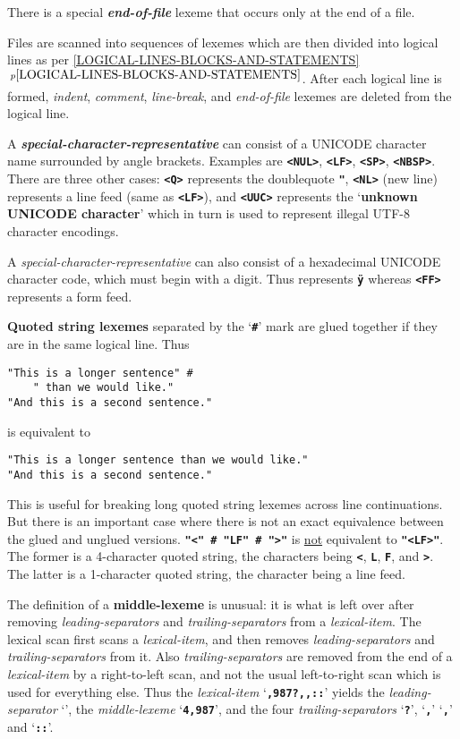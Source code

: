 \documentclass[12pt]{article}
\newcommand{\TT}[1]{{\tt \bfseries #1}}
\newcommand{\key}[1]{{\rm \bfseries #1}}
\newcommand{\emkey}[1]{{\em \bfseries #1}}
\newcommand{\tttkey}[1]{{\tt \bfseries <#1>}}
\newcommand{\itemref}[1]{\ref{#1}$\,^{p\pageref{#1}}$}
\newenvironment{indpar}[1][0.3in]%
	{\begin{list}{}%
		     {\setlength{\itemsep}{0in}%
		      \setlength{\topsep}{0in}%
		      \setlength{\parsep}{1ex}%
		      \setlength{\labelwidth}{#1}%
		      \setlength{\leftmargin}{#1}%
		      \addtolength{\leftmargin}{\labelsep}}%
	 \item}%
	{\end{list}}
\begin{document}
There is a special \emkey{end-of-file}\label{END-OF-FILE}
lexeme that occurs only at the end of a file.

Files are scanned into sequences of lexemes which are then divided
into logical lines as per \itemref{LOGICAL-LINES-BLOCKS-AND-STATEMENTS}.
After each logical line is formed,
{\em indent}, {\em comment},
{\em line-break}, and {\em end-of-file} lexemes are deleted
from the logical line.

A \emkey{special-character-representative} can consist of
a UNICODE character name surrounded by angle brackets.  Examples are
\TT{<NUL>}, \TT{<LF>}, \TT{<SP>}, \TT{<NBSP>}.  There are three other cases:
\tttkey{Q} represents the doublequote \TT{"}, \tttkey{NL} (new line)
represents a line feed (same as \TT{<LF>}), and \tttkey{UUC} represents
the `\key{unknown UNICODE character}' which in turn is used to represent
illegal UTF-8 character encodings.

A {\em special-character-representative} can also consist of
a hexadecimal UNICODE character code, which must begin with a digit.
Thus \TT{<0FF>} represents \TT{\"y} whereas \TT{<FF>} represents
a form feed.

\key{Quoted string lexemes}
\label{QUOTED-STRING-CONCATENATION}
separated by the `\TT{\#}' mark
are glued together if they are in the
same logical line.  Thus
\begin{indpar}\begin{verbatim}
"This is a longer sentence" #
    " than we would like."
"And this is a second sentence."
\end{verbatim}\end{indpar}
is equivalent to
\begin{indpar}\begin{verbatim}
"This is a longer sentence than we would like."
"And this is a second sentence."
\end{verbatim}\end{indpar}
This is useful for
breaking long quoted string lexemes across line continuations.
But there is an important case where there is not an exact equivalence
between the glued and unglued versions.  \TT{"<" \# "LF" \# ">"} is
\underline{not} equivalent to \TT{"<LF>"}.  The former is a 4-character
quoted string, the characters being \TT{<}, \TT{L}, \TT{F},
and \TT{>}.  The latter is a 1-character quoted string, the character
being a line feed.

The definition of a \key{middle-lexeme} is unusual: it is what is left over
after removing {\em leading-separators} and {\em trailing-separators}
from a {\em lexical-item}.  The lexical scan first scans a
{\em lexical-item}, and then removes
{\em leading-separators} and {\em trailing-separators} from it.
Also {\em trailing-separators} are removed
from the end of a {\em lexical-item} by a right-to-left scan, and not
the usual left-to-right scan which is used for everything else.
Thus the {\em lexical-item}
`\TT{,987?,{},::}' yields the
{\em leading-separator} `\TT{\textquestiondown}',
the {\em middle-lexeme} `\TT{4,987}',
and the four {\em trailing-separators} `\TT{?}',
`\TT{,}' `\TT{,}' and `\TT{::}'.
\end{document}
